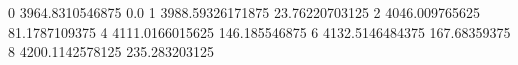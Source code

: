 0 3964.8310546875 0.0
1 3988.59326171875 23.76220703125
2 4046.009765625 81.1787109375
4 4111.0166015625 146.185546875
6 4132.5146484375 167.68359375
8 4200.1142578125 235.283203125
